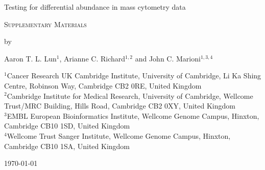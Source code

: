 \documentclass{article}
\begin{document}
\begin{titlepage}
\vspace*{3cm}
\begin{center}

{\LARGE
Testing for differential abundance in mass cytometry data
\par}

\vspace{0.75cm}

{\Large 
    \textsc{Supplementary Materials}
\par
}
\vspace{0.75cm}

\large
by

\vspace{0.75cm}
Aaron T. L. Lun$^{1}$, Arianne C. Richard$^{1,2}$ and John C. Marioni$^{1,3,4}$

\vspace{1cm}
\begin{minipage}{0.9\textwidth}
\begin{flushleft} 
$^1$Cancer Research UK Cambridge Institute, University of Cambridge, Li Ka Shing Centre, Robinson Way, Cambridge CB2 0RE, United Kingdom \\[6pt]
$^2$Cambridge Institute for Medical Research,  University of Cambridge, Wellcome Trust/MRC Building, Hills Road, Cambridge CB2 0XY, United Kingdom \\[6pt]
$^3$EMBL European Bioinformatics Institute, Wellcome Genome Campus, Hinxton, Cambridge CB10 1SD, United Kingdom \\[6pt]
$^4$Wellcome Trust Sanger Institute, Wellcome Genome Campus, Hinxton, Cambridge CB10 1SA, United Kingdom \\[6pt]
\end{flushleft}
\end{minipage}

\vspace{1.5cm}
{\large \today{}}

\vspace*{\fill}
\end{center}
\end{titlepage}
\end{document}

